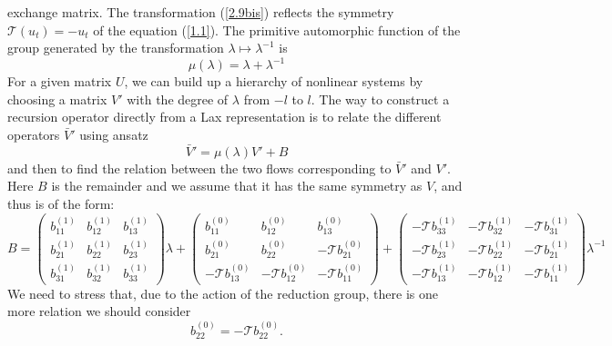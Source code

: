 \documentclass{article}
\numberwithin{equation}{section}
\newcommand\cT{{\mathcal T}}
\begin{document}
exchange matrix. The transformation (\ref{2.9bis}) reflects the symmetry $\cT(u_t)=-u_t$ of the 
equation (\ref{1.1}). The primitive automorphic function 
of the group generated by the transformation $\lambda\mapsto \lambda^{-1}$ is
	\begin{equation}
		\mu(\lambda) = \lambda + \lambda^{-1}
		\label{prim}
	\end{equation}
For a given matrix $U$, we can build up a hierarchy of nonlinear systems by 
choosing a matrix $V'$ with the degree of $\lambda$ from $-l$ to $l$.
The way to construct a recursion operator directly from a Lax representation 
is to
relate the different operators ${\bar V'}$ using ansatz $${\bar 
V'}=\mu (\lambda) V' +B$$ and then to find the relation between the two flows corresponding to 
$\bar V'$ and $V'$. Here $B$ is the remainder and we assume that it 
has the same symmetry as $V$, and thus is of the form:
	\begin{equation}
		B=\begin{pmatrix}
			b^{(1)}_{    11} & b^{(1)}_{    12} & b^{(1)}_{    13}\\
			b^{(1)}_{    21} & b^{(1)}_{    22} & b^{(1)}_{    23}\\
			b^{(1)}_{    31} & b^{(1)}_{    32} & b^{(1)}_{    33}
		\end{pmatrix} \lambda +
		\begin{pmatrix}
			b^{(0)}_{    11} & b^{(0)}_{    12} & b^{(0)}_{    13}\\
			b^{(0)}_{    21} & b^{(0)}_{    22} & 
-\mathcal{T}b^{(0)}_{    21}\\
			-\mathcal{T}b^{(0)}_{    13} & -\mathcal{T}b^{(0)}_{    
12} & -\mathcal{T}b^{(0)}_{    11}
		\end{pmatrix}+
		\begin{pmatrix}
			-\mathcal{T} b^{(1)}_{    33} &  -\mathcal{T} b^{(1)}_{  
  32} &-\mathcal{T}b^{(1)}_{    31}\\
			-\mathcal{T} b^{(1)}_{    23} &  -\mathcal{T} b^{(1)}_{  
  22} &-\mathcal{T}b^{(1)}_{    21}\\
			-\mathcal{T} b^{(1)}_{    13} &  -\mathcal{T} b^{(1)}_{  
  12} &-\mathcal{T}b^{(1)}_{    11}
		\end{pmatrix} \lambda^{-1}
		\label{3.6b}
	\end{equation}
	We need to stress that, due to the action of the reduction group, there 
is one more relation we should consider
	\begin{equation}
		b^{(0)}_{    22} = -\mathcal{T}b^{(0)}_{    22}.
		\label{5.1bis}
	\end{equation}
\end{document}
